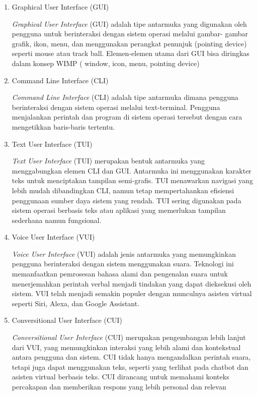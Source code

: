 \documentclass[12pt]{article}
\begin{document}
\begin{enumerate}
    \item{Graphical User Interface (GUI) }



\textit{Graphical User Interface} (GUI) adalah tipe antarmuka yang digunakan
oleh pengguna untuk berinteraksi dengan sistem operasi melalui gambar- gambar grafik, ikon, menu, dan menggunakan perangkat penunjuk (pointing
device) seperti mouse atau track ball. Elemen-elemen utama dari GUI bisa
diringkas dalam konsep WIMP ( window, icon, menu, pointing device)



 \item{Command Line Interface (CLI)}

\textit{Command Line Interface} (CLI) adalah tipe antarmuka dimana pengguna berinteraksi dengan sistem operasi melalui text-terminal. Pengguna menjalankan perintah dan program di sistem operasi tersebut dengan cara mengetikkan baris-baris tertentu.




\item{ Text User Interface (TUI)}

\textit{Text User Interface} (TUI) merupakan bentuk antarmuka yang menggabungkan elemen CLI dan GUI. Antarmuka ini menggunakan karakter teks untuk menciptakan tampilan semi-grafis. TUI menawarkan navigasi yang lebih mudah dibandingkan CLI, namun tetap mempertahankan efisiensi penggunaan sumber daya sistem yang rendah. TUI sering digunakan pada sistem operasi berbasis teks atau aplikasi yang memerlukan tampilan sederhana namun fungsional.

\item {Voice User Interface (VUI)}

\textit{Voice User Interface} (VUI) adalah jenis antarmuka yang memungkinkan pengguna berinteraksi dengan sistem menggunakan suara. Teknologi ini memanfaatkan pemrosesan bahasa alami dan pengenalan suara untuk menerjemahkan perintah verbal menjadi tindakan yang dapat dieksekusi oleh sistem. VUI telah menjadi semakin populer dengan munculnya asisten virtual seperti Siri, Alexa, dan Google Assistant.


\item{Conversitional User Interface (CUI)}

\textit{Conversitional User Interface} (CUI) merupakan pengembangan lebih lanjut dari VUI, yang memungkinkan interaksi yang lebih alami dan kontekstual antara pengguna dan sistem. CUI tidak hanya mengandalkan perintah suara, tetapi juga dapat menggunakan teks, seperti yang terlihat pada chatbot dan asisten virtual berbasis teks. CUI dirancang untuk memahami konteks percakapan dan memberikan respons yang lebih personal dan relevan

\end{enumerate}
\end{document}
